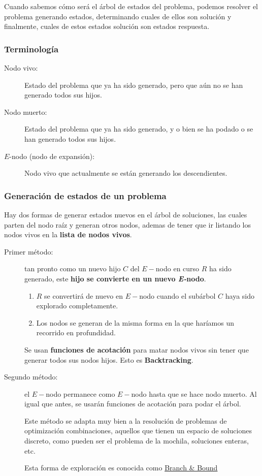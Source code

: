 \documentclass[10pt,a4paper,spanish]{report}
\theoremstyle{definition}
\theoremstyle{remark}
\begin{document}
Cuando sabemos cómo será el árbol de estados del problema, podemos resolver el problema generando estados, determinando cuales de ellos son solución y finalmente, cuales de estos estados solución son estados respuesta.

\subsubsection{\textcolor{electricgreen}Terminología}

\begin{description}
    \item [Nodo vivo:] Estado del problema que ya ha sido generado, pero que aún no se han generado todos sus hijos.
    \item [Nodo muerto:] Estado del problema que ya ha sido generado, y o bien se ha podado o se han generado todos sus hijos.
    \item [$E$-nodo (nodo de expansión):] Nodo vivo que actualmente se están generando los descendientes.
\end{description}

\subsubsection{\textcolor{electricgreen}Generación de estados de un problema}

Hay dos formas de generar estados nuevos en el árbol de soluciones,  las cuales parten del nodo raíz y generan otros nodos, ademas de tener que ir listando los nodos vivos en la \textbf{\textcolor{electricgreen}lista de nodos vivos}.

\begin{description}
    \item [Primer método:] tan pronto como un nuevo hijo $C$ del $E-$nodo en curso $R$ ha sido generado, este \textbf{\textcolor{electricgreen}{hijo se convierte en un nuevo \textit{E-}nodo}}.
    \begin{enumerate}[---]
        \item $R$ se convertirá de nuevo en $E-$nodo cuando el subárbol $C$ haya sido explorado completamente.
        \item Los nodos se generan de la misma forma en la que haríamos un recorrido en profundidad.
    \end{enumerate}
    Se usan \textbf{\textcolor{electricgreen}{funciones de acotación}} para matar nodos vivos sin tener que generar todos sus nodos hijos. Esto es \textbf{\textcolor{electricgreen}{Backtracking}}.

    \item [Segundo método:] el $E-$nodo permanece como $E-$nodo hasta que se hace nodo muerto. Al igual que antes, se usarán funciones de acotación para podar el árbol.

    Este método se adapta muy bien a la resolución de problemas de optimización combinaciones, aquellos que tienen un espacio de soluciones discreto, como pueden ser el problema de la mochila, soluciones enteras, etc.

    Esta forma de exploración es conocida como \hyperref[branchandbound]{Branch \& Bound}
\end{description}
\end{document}
